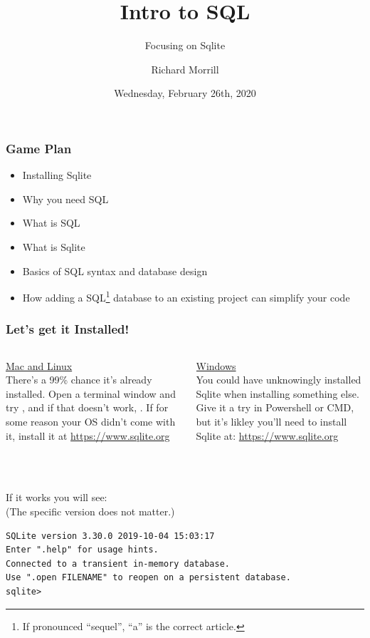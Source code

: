 \documentclass[aspectratio=169]{beamer}
\title{Intro to SQL}
\subtitle{Focusing on Sqlite}
\author{Richard Morrill}
\institute{Fordham University CS Society}
\date{Wednesday, February 26th, 2020}
\begin{document}
\begin{frame}
    \titlepage
\end{frame}

\begin{frame}
    \frametitle{Game Plan}

    \begin{itemize}
        \item Installing Sqlite
        \item Why you need SQL
        \item What is SQL
        \item What is Sqlite
        \item Basics of SQL syntax and database design
        \item How adding a SQL\footnote[frame]{If pronounced ``sequel'', ``a'' is the correct article.} database to an existing project can
              simplify your code
    \end{itemize}

\end{frame}
\begin{frame}[fragile]
    \frametitle{Let's get it Installed!}

    \begin{columns}
        \begin{column}{0.4\textwidth}
            \underline{Mac and Linux}\\
            \small{
                There's a 99\% chance it's already installed.  Open a terminal
                window and try , and if that doesn't work,
                .  If for some reason your OS didn't come with it,
                install it at \url{https://www.sqlite.org}
            }
        \end{column}
        \begin{column}{0.4\textwidth}
            \underline{Windows}\\
            \small{
                You could have unknowingly installed Sqlite when installing
                something else.  Give it a try in Powershell or CMD, but it's likley
                you'll need to install Sqlite at: \url{https://www.sqlite.org}
            }
        \end{column}
    \end{columns}
    ~\\~\\
    If it works you will see:\\
    (The specific version does not matter.)
    \begin{verbatim}
SQLite version 3.30.0 2019-10-04 15:03:17
Enter ".help" for usage hints.
Connected to a transient in-memory database.
Use ".open FILENAME" to reopen on a persistent database.
sqlite>
    \end{verbatim}
\end{frame}
\end{document}
